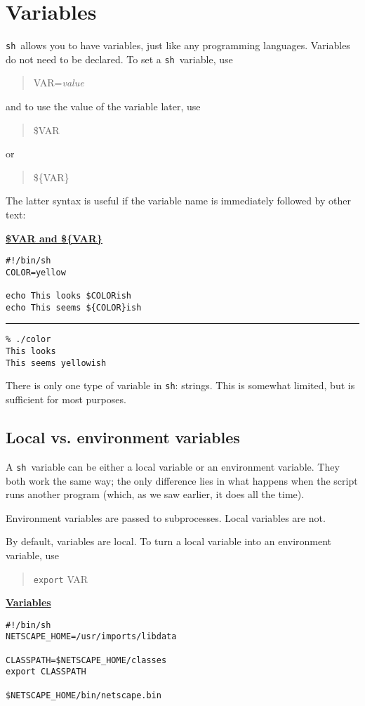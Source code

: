 \documentclass{article}
\newcommand{\heading}[1]{%
  \begin{center}
    \large\textbf{\underline{#1}}
  \end{center}
  \vspace{1ex minus 1ex}}
\newcommand{\code}[1]{\texttt{#1}}
\newcommand{\sh}{\code{sh}}
\newlength{\slidewidth}
\newenvironment{boxit}{%
  \begin{lrbox}{\savepar}
  \begin{minipage}[b]{\slidewidth}%
}{
  \end{minipage}
  \end{lrbox}
  \fbox{\usebox{\savepar}}
}
\newcommand{\slidecaption}{}
\newenvironment{slide}[1]{%
\renewcommand\figurename{Slide}
\renewcommand{\slidecaption}{#1}
\bigskip
\begin{boxit}
\heading{\slidecaption}
}{%
\end{boxit}
\bigskip
}
\begin{document}
\section{Variables}

	\sh\ allows you to have variables, just like any programming
languages. Variables do not need to be declared. To set a \sh\
variable, use
\begin{quote}
VAR=\textsl{value}
\end{quote}
and to use the value of the variable later, use
\begin{quote}
\$VAR
\end{quote}
or
\begin{quote}
\$\{VAR\}
\end{quote}

	The latter syntax is useful if the variable name is
immediately followed by other text:

\begin{slide}{\$VAR and \$\{VAR\}}
\begin{verbatim}
#!/bin/sh
COLOR=yellow

echo This looks $COLORish
echo This seems ${COLOR}ish
\end{verbatim}
\bigskip
\hrule
\bigskip
\begin{verbatim}
% ./color
This looks
This seems yellowish
\end{verbatim}
\end{slide}

	There is only one type of variable in \sh: strings. This is
somewhat limited, but is sufficient for most purposes.

\subsection{Local vs. environment variables}

	A \sh\ variable can be either a local variable or an
environment variable. They both work the same way; the only difference
lies in what happens when the script runs another program (which, as
we saw earlier, it does all the time).

	Environment variables are passed to subprocesses. Local
variables are not.

	By default, variables are local. To turn a local variable into
an environment variable, use
\begin{quote}
\code{export} VAR
\end{quote}

\begin{slide}{Variables}
\label{var-example}

\begin{verbatim}
#!/bin/sh
NETSCAPE_HOME=/usr/imports/libdata

CLASSPATH=$NETSCAPE_HOME/classes
export CLASSPATH

$NETSCAPE_HOME/bin/netscape.bin
\end{verbatim}
\end{slide}
\end{document}
